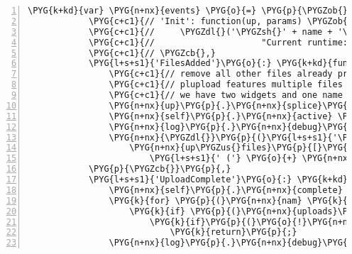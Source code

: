\begin{Verbatim}[commandchars=\\\{\},numbers=left,firstnumber=1,stepnumber=5]
        \PYG{k+kd}{var} \PYG{n+nx}{events} \PYG{o}{=} \PYG{p}{\PYGZob{}}
            \PYG{c+c1}{// 'Init': function(up, params) \PYGZob{}}
            \PYG{c+c1}{//     \PYGZdl{}('\PYGZsh{}' + name + '\PYGZus{}progress .filestatus').text(}
            \PYG{c+c1}{//                     "Current runtime: " + params.runtime);}
            \PYG{c+c1}{// \PYGZcb{},}
            \PYG{l+s+s1}{'FilesAdded'}\PYG{o}{:} \PYG{k+kd}{function}\PYG{p}{(}\PYG{n+nx}{up}\PYG{p}{,} \PYG{n+nx}{up\PYGZus{}files}\PYG{p}{)} \PYG{p}{\PYGZob{}}
                \PYG{c+c1}{// remove all other files already present}
                \PYG{c+c1}{// plupload features multiple files in one widget}
                \PYG{c+c1}{// we have two widgets and one name per widget}
                \PYG{n+nx}{up}\PYG{p}{.}\PYG{n+nx}{splice}\PYG{p}{(}\PYG{p}{)}\PYG{p}{;}
                \PYG{n+nx}{self}\PYG{p}{.}\PYG{n+nx}{active} \PYG{o}{=} \PYG{k+kc}{true}\PYG{p}{;}
                \PYG{n+nx}{log}\PYG{p}{.}\PYG{n+nx}{debug}\PYG{p}{(}\PYG{l+s+s2}{"FilesAdded"}\PYG{p}{,} \PYG{n+nx}{up}\PYG{p}{.}\PYG{n+nx}{files}\PYG{p}{,} \PYG{n+nx}{up\PYGZus{}files}\PYG{p}{)}\PYG{p}{;}
                \PYG{n+nx}{\PYGZdl{}}\PYG{p}{(}\PYG{l+s+s1}{'\PYGZsh{}'} \PYG{o}{+} \PYG{n+nx}{name} \PYG{o}{+} \PYG{l+s+s1}{'\PYGZus{}progress .filestatus'}\PYG{p}{)}\PYG{p}{.}\PYG{n+nx}{text}\PYG{p}{(}
                    \PYG{n+nx}{up\PYGZus{}files}\PYG{p}{[}\PYG{l+m+mi}{0}\PYG{p}{]}\PYG{p}{.}\PYG{n+nx}{name} \PYG{o}{+}
                        \PYG{l+s+s1}{' ('} \PYG{o}{+} \PYG{n+nx}{plupload}\PYG{p}{.}\PYG{n+nx}{formatSize}\PYG{p}{(}\PYG{n+nx}{up\PYGZus{}files}\PYG{p}{[}\PYG{l+m+mi}{0}\PYG{p}{]}\PYG{p}{.}\PYG{n+nx}{size}\PYG{p}{)} \PYG{o}{+} \PYG{l+s+s1}{')'}\PYG{p}{)}\PYG{p}{;}
            \PYG{p}{\PYGZcb{}}\PYG{p}{,}
            \PYG{l+s+s1}{'UploadComplete'}\PYG{o}{:} \PYG{k+kd}{function}\PYG{p}{(}\PYG{n+nx}{up}\PYG{p}{,} \PYG{n+nx}{up\PYGZus{}files}\PYG{p}{)} \PYG{p}{\PYGZob{}}
                \PYG{n+nx}{self}\PYG{p}{.}\PYG{n+nx}{complete} \PYG{o}{=} \PYG{k+kc}{true}\PYG{p}{;}
                \PYG{k}{for} \PYG{p}{(}\PYG{n+nx}{nam} \PYG{k}{in} \PYG{n+nx}{uploads}\PYG{p}{)}
                    \PYG{k}{if} \PYG{p}{(}\PYG{n+nx}{uploads}\PYG{p}{[}\PYG{n+nx}{nam}\PYG{p}{]}\PYG{p}{.}\PYG{n+nx}{active}\PYG{p}{)}
                        \PYG{k}{if}\PYG{p}{(}\PYG{o}{!}\PYG{n+nx}{uploads}\PYG{p}{[}\PYG{n+nx}{nam}\PYG{p}{]}\PYG{p}{.}\PYG{n+nx}{complete}\PYG{p}{)}
                            \PYG{k}{return}\PYG{p}{;}
                \PYG{n+nx}{log}\PYG{p}{.}\PYG{n+nx}{debug}\PYG{p}{(}\PYG{l+s+s2}{"UploadComplete"}\PYG{p}{,} \PYG{l+s+s2}{"go"}\PYG{p}{)}\PYG{p}{;}

\end{Verbatim}
